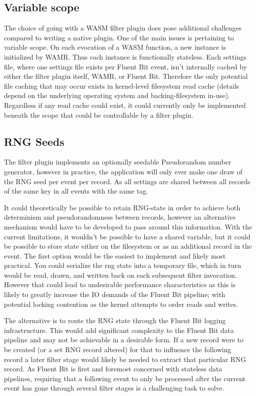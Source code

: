 \subsection{Variable scope}
The choice of going with a WASM filter plugin does pose additional challenges compared to writing a native plugin. One of the main issues is pertaining to variable scope. On each evocation of a WASM function, a new instance is initialized by WAMR. Thus each instance is functionally stateless. Each settings file, where one settings file exists per Fluent Bit event, isn't internally cached by either the filter plugin itself, WAMR, or Fluent Bit. Therefore the only potential file caching that may occur exists in kernel-level filesystem read cache (details depend on the underlying operating system and backing-filesystem in-use). Regardless if any read cache could exist, it could currently only be implemented beneath the scope that could be controllable by a filter plugin.

\subsection{RNG Seeds}
The filter plugin implements an optionally seedable Pseudorandom number generator, however in practice, the application will only ever make one draw of the RNG seed per event per record. As all settings are shared between all records of the same key in all events with the same tag.

It could theoretically be possible to retain RNG-state in order to achieve both determinism and pseudorandomness between records, however an alternative mechanism would have to be developed to pass around this information. With the current limitations, it wouldn't be possible to have a shared variable, but it could be possible to store state either on the filesystem or as an additional record in the event. The first option would be the easiest to implement and likely most practical. You could serialize the rng state into a temporary file, which in turn would be read, drawn, and written back on each subsequent filter invocation. However that could lead to undesirable performance characteristics as this is likely to greatly increase the IO demands of the Fluent Bit pipeline; with potential locking contention as the kernel attempts to order reads and writes.

The alternative is to route the RNG state through the Fluent Bit logging infrastructure. This would add significant complexity to the Fluent Bit data pipeline and may not be achievable in a desirable form. If a new record were to be created (or a set RNG record altered) for that to influence the following record a later filter stage would likely be needed to extract that particular RNG record. As Fluent Bit is first and foremost concerned with stateless data pipelines, requiring that a following event to only be processed after the current event has gone through several filter stages is a challenging task to solve. 

